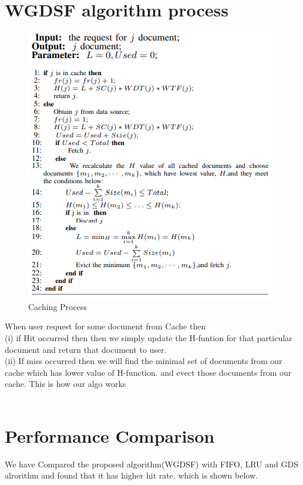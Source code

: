 \documentclass[conference]{IEEEtran}
\begin{document}
\section{WGDSF algorithm process}

\begin{figure}[htbp]
\centerline{\includegraphics[width = 0.8\linewidth]{code.png}}
\caption{Caching Process}
\label{fig}
\end{figure}

When user request for some document from Cache then\\ (i) if Hit occurred then then we simply update the H-funtion for that particular document and return that document to user.\\
(ii) If miss occurred then we will find the minimal set of documents from our cache which has lower value of H-function. and evect those documents from our cache. This is how our algo works\\ \\ 

\section{Performance Comparison}
We have Compared the proposed algorithm(WGDSF) with FIFO, LRU and GDS alrorithm and found that it has higher hit rate. which is shown below.\\
\end{document}
